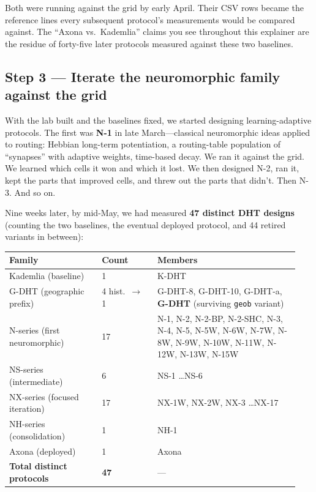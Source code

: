 \documentclass[nobib]{tufte-handout}
\begin{document}
Both were running against the grid by early April.  Their CSV rows became the reference lines every subsequent protocol's measurements would be compared against. The ``Axona vs.\ Kademlia'' claims you see throughout this explainer are the residue of forty-five later protocols measured against these two baselines.

\subsection*{Step 3 --- Iterate the neuromorphic family against the grid}

With the lab built and the baselines fixed, we started designing learning-adaptive protocols. The first was \textbf{N-1} in late March---classical neuromorphic ideas applied to routing: Hebbian long-term potentiation, a routing-table population of ``synapses'' with adaptive weights, time-based decay. We ran it against the grid. We learned which cells it won and which it lost. We then designed N-2, ran it, kept the parts that improved cells, and threw out the parts that didn't. Then N-3. And so on.

Nine weeks later, by mid-May, we had measured \textbf{47 distinct DHT designs} (counting the two baselines, the eventual deployed protocol, and 44 retired variants in between):

\begin{table}[h]
\small
\begin{tabular}{@{}p{0.30\linewidth}p{0.18\linewidth}p{0.46\linewidth}@{}}
\toprule
\textbf{Family} & \textbf{Count} & \textbf{Members} \\
\midrule
Kademlia (baseline) & 1 & K-DHT \\
G-DHT (geographic prefix) & 4 hist.\ $\to$ 1 & G-DHT-8, G-DHT-10, G-DHT-a, \textbf{G-DHT} (surviving \texttt{geob} variant) \\
N-series (first neuromorphic) & 17 & N-1, N-2, N-2-BP, N-2-SHC, N-3, N-4, N-5, N-5W, N-6W, N-7W, N-8W, N-9W, N-10W, N-11W, N-12W, N-13W, N-15W \\
NS-series (intermediate) & 6 & NS-1 \dots NS-6 \\
NX-series (focused iteration) & 17 & NX-1W, NX-2W, NX-3 \dots NX-17 \\
NH-series (consolidation) & 1 & NH-1 \\
Axona (deployed) & 1 & Axona \\
\midrule
\textbf{Total distinct protocols} & \textbf{47} & --- \\
\bottomrule
\end{tabular}
\end{table}
\end{document}

